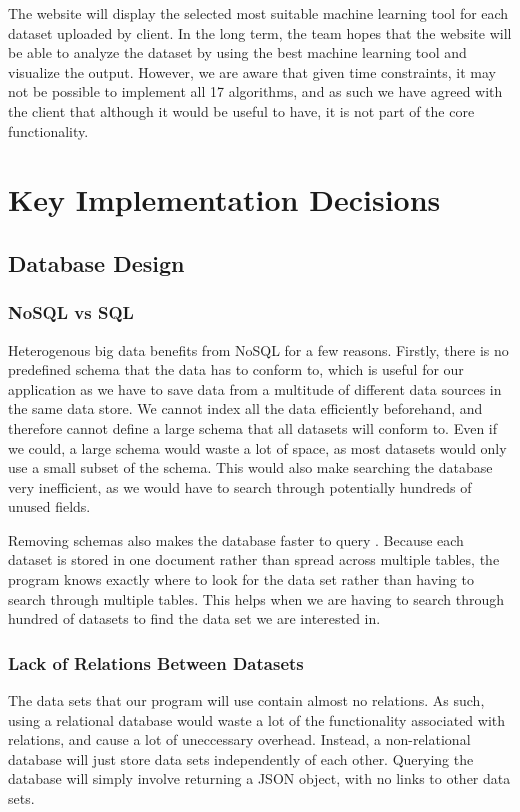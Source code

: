 \documentclass[titlepage]{article}
\begin{document}
The website will display the selected most suitable machine learning tool for each dataset uploaded by client. In the long term, the team hopes that the website will be able to analyze the dataset by using the best machine learning tool and visualize the output. However, we are aware that given time constraints, it may not be possible to implement all 17 algorithms, and as such we have agreed with the client that although it would be useful to have, it is not part of the core functionality.

\section{Key Implementation Decisions}
\subsection{Database Design}

\subsubsection{NoSQL vs SQL}
Heterogenous big data benefits from NoSQL for a few reasons. Firstly, there is no predefined schema that the data has to conform to, which is useful for our application as we have to save data from a multitude of different data sources in the same data store. We cannot index all the data efficiently beforehand, and therefore cannot define a large schema that all datasets will conform to. Even if we could, a large schema would waste a lot of space, as most datasets would only use a small subset of the schema. This would also make searching the database very inefficient, as we would have to search through potentially hundreds of unused fields.

Removing schemas also makes the database faster to query \cite{sqlvsnosql}. Because each dataset is stored in one document rather than spread across multiple tables, the program knows exactly where to look for the data set rather than having to search through multiple tables. This helps when we are having to search through hundred of datasets to find the data set we are interested in.

\subsubsection{Lack of Relations Between Datasets}
The data sets that our program will use contain almost no relations. As such, using a relational database would waste a lot of the functionality associated with relations, and cause a lot of uneccessary overhead. Instead, a non-relational database will just store data sets independently of each other. Querying the database will simply involve returning a JSON object, with no links to other data sets.
\end{document}
